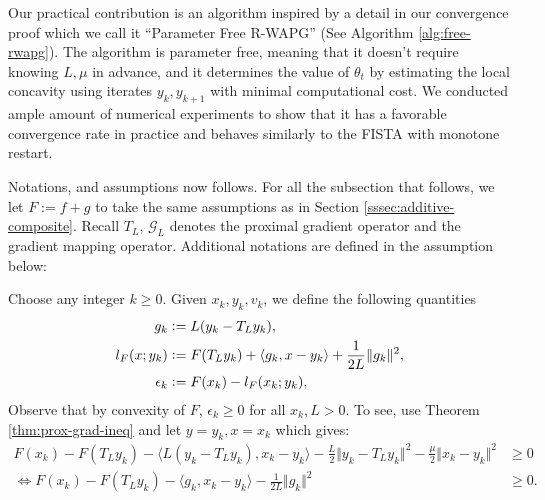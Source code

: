 \documentclass[12pt]{article}
\begin{document}
        Our practical contribution is an algorithm inspired by a detail in our convergence proof which we call it ``Parameter Free R-WAPG'' (See Algorithm \ref{alg:free-rwapg}). 
        The algorithm is parameter free, meaning that it doesn't require knowing $L, \mu$ in advance, and it determines the value of $\theta_t$ by estimating the local concavity using iterates $y_{k}, y_{k + 1}$ with minimal computational cost. 
        We conducted ample amount of numerical experiments to show that it has a favorable convergence rate in practice and behaves similarly to the FISTA with monotone restart. 
        \par
        Notations, and assumptions now follows. 
        For all the subsection that follows, we let $F:= f + g$ to take the same assumptions as in Section \ref{sssec:additive-composite}. 
        Recall $T_L$, $\mathcal G_L$ denotes the proximal gradient operator and the gradient mapping operator. 
        Additional notations are defined in the assumption below: 
        \begin{assumption}
            Choose any integer $k\ge 0$. 
            Given $x_k, y_k, v_k$, we define the following quantities
            \begin{align}
                g_k &\vcentcolon= L(y_k - T_L y_k), 
                \label{eqn:grad-map}
                \\
                l_F(x; y_k) &\vcentcolon= F(T_Ly_k) + \langle g_k, x - y_k\rangle + \frac{1}{2L}\Vert g_k\Vert^2, 
                \label{eqn:lower-linearization}
                \\
                \epsilon_{k} &\vcentcolon= F(x_k) - l_F(x_k; y_k), 
                \label{eqn:regret}
            \end{align}
            Observe that by convexity of $F$, $\epsilon_k \ge 0$ for all $x_k, L > 0$. 
            To see, use Theorem \ref{thm:prox-grad-ineq} and let $y = y_k, x = x_k$ which gives: 
            \begin{align*}
                F(x_k) - F(T_Ly_k)
                - \langle L(y_k - T_Ly_k),x_k - y_k \rangle
                - \frac{L}{2}\Vert y_k - T_Ly_k\Vert^2
                - \frac{\mu}{2}\Vert x_k - y_k\Vert^2
                &\ge 0
                \\
                \iff 
                F(x_k) - F(T_Ly_k)
                - \langle g_k,x_k - y_k \rangle
                - \frac{1}{2L}\Vert g_k\Vert^2
                &\ge 0. 
            \end{align*}
        \end{assumption}
        \par
\end{document}

